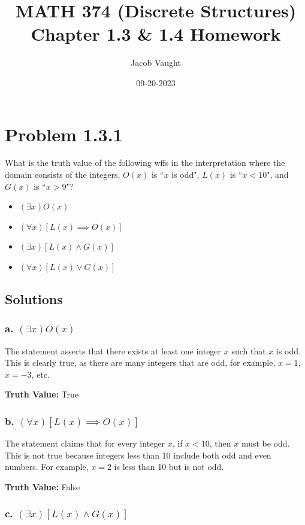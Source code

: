 \documentclass[12pt]{article}
\title{MATH 374 (Discrete Structures)\\Chapter 1.3 \& 1.4 Homework}
\author{Jacob Vaught}
\date{09-20-2023}
\begin{document}
\maketitle
\newpage
\section*{Problem 1.3.1}
What is the truth value of the following wffs in the interpretation where the domain consists of the integers, \(O(x)\) is ``\(x\) is odd", \(L(x)\) is ``\(x < 10\)", and \(G(x)\) is ``\(x > 9\)"?
\begin{itemize}
    \item[a.] \((\exists x)O(x)\)
    \item[b.] \((\forall x)[L(x) \implies O(x)]\)
    \item[c.] \((\exists x)[L(x) \land G(x)]\)
    \item[d.] \((\forall x)[L(x) \lor G(x)]\)
\end{itemize}

\subsection*{Solutions}

\subsubsection*{a. \((\exists x)O(x)\)}

The statement asserts that there exists at least one integer \( x \) such that \( x \) is odd. This is clearly true, as there are many integers that are odd, for example, \( x = 1 \), \( x = -3 \), etc.

\textbf{Truth Value:} True

\subsubsection*{b. \((\forall x)[L(x) \implies O(x)]\)}

The statement claims that for every integer \( x \), if \( x < 10 \), then \( x \) must be odd. This is not true because integers less than 10 include both odd and even numbers. For example, \( x = 2 \) is less than 10 but is not odd.

\textbf{Truth Value:} False

\subsubsection*{c. \((\exists x)[L(x) \land G(x)]\)}
\end{document}
